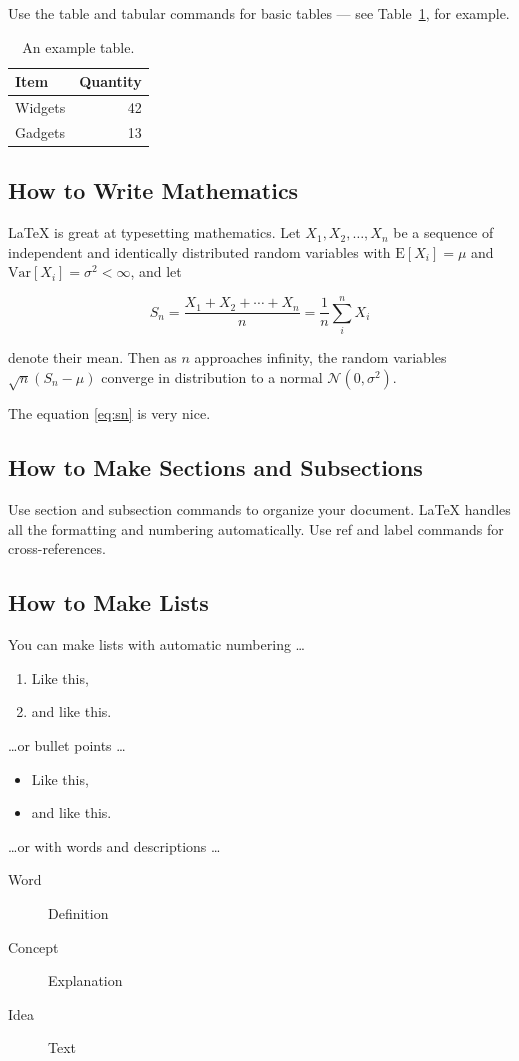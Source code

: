 \documentclass[a4paper]{article}
\begin{document}
Use the table and tabular commands for basic tables --- see Table~\ref{tab:widgets}, for example.

\begin{table}[ht]
\centering
\begin{tabular}{l|r}
Item & Quantity \\\hline
Widgets & 42 \\
Gadgets & 13
\end{tabular}
\caption{\label{tab:widgets}An example table.}
\end{table}

\subsection{How to Write Mathematics}

\LaTeX{} is great at typesetting mathematics. Let $X_1, X_2, \ldots, X_n$ be a sequence of independent and identically distributed random variables with $\text{E}[X_i] = \mu$ and $\text{Var}[X_i] = \sigma^2 < \infty$, and let

\begin{equation}
S_n = \frac{X_1 + X_2 + \cdots + X_n}{n}
      = \frac{1}{n}\sum_{i}^{n} X_i
\label{eq:sn}
\end{equation}

denote their mean. Then as $n$ approaches infinity, the random variables $\sqrt{n}(S_n - \mu)$ converge in distribution to a normal $\mathcal{N}(0, \sigma^2)$.

The equation \ref{eq:sn} is very nice.

\subsection{How to Make Sections and Subsections}

Use section and subsection commands to organize your document. \LaTeX{} handles all the formatting and numbering automatically. Use ref and label commands for cross-references.

\subsection{How to Make Lists}

You can make lists with automatic numbering \dots

\begin{enumerate}
\item Like this,
\item and like this.
\end{enumerate}
\dots or bullet points \dots
\begin{itemize}
\item Like this,
\item and like this.
\end{itemize}
\dots or with words and descriptions \dots
\begin{description}
\item[Word] Definition
\item[Concept] Explanation
\item[Idea] Text
\end{description}
\end{document}
